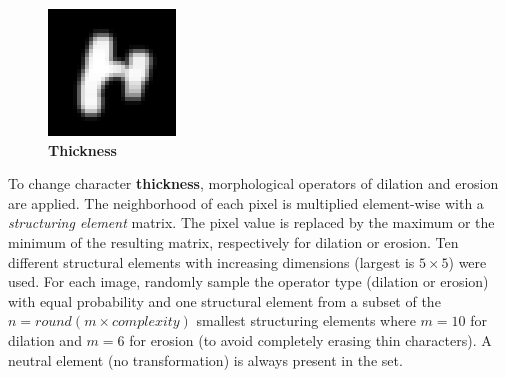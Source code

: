 \documentclass{article} %
\begin{document}
\begin{minipage}[h]{\linewidth}
\begin{figure}
\begin{center}
\vspace*{-5mm}
\includegraphics[scale=.4]{images/Thick_only.png}\\
{\bf Thickness}
\end{center}
\end{figure}
To change character {\bf thickness}, morphological operators of dilation and erosion~\citep{Haralick87,Serra82}
are applied. The neighborhood of each pixel is multiplied
element-wise with a {\em structuring element} matrix.
The pixel value is replaced by the maximum or the minimum of the resulting
matrix, respectively for dilation or erosion. Ten different structural elements with 
increasing dimensions (largest is $5\times5$) were used.  For each image, 
randomly sample the operator type (dilation or erosion) with equal probability and one structural
element from a subset of the $n=round(m \times complexity)$ smallest structuring elements
where $m=10$ for dilation and $m=6$ for erosion (to avoid completely erasing thin characters).  
A neutral element (no transformation) 
is always present in the set.
\end{minipage}
\vspace*{3mm}
\end{document}
